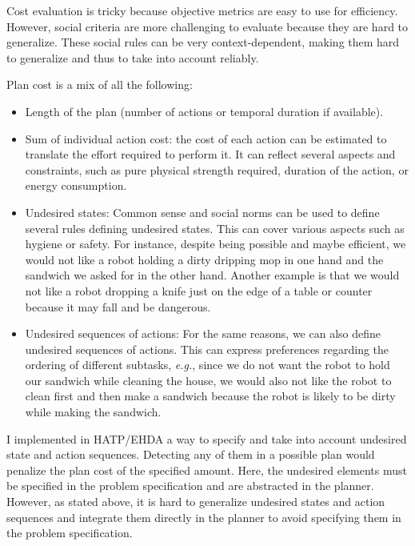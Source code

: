 Cost evaluation is tricky because objective metrics are easy to use for efficiency. However, social criteria are more challenging to evaluate because they are hard to generalize. These social rules can be very context-dependent, making them hard to generalize and thus to take into account reliably.

Plan cost is a mix of all the following:

\begin{itemize}
    \item Length of the plan (number of actions or temporal duration if available).
    \item Sum of individual action cost: the cost of each action can be estimated to translate the effort required to perform it. It can reflect several aspects and constraints, such as pure physical strength required, duration of the action, or energy consumption.
    \item Undesired states: Common sense and social norms can be used to define several rules defining undesired states. This can cover various aspects such as hygiene or safety. For instance, despite being possible and maybe efficient, we would not like a robot holding a dirty dripping mop in one hand and the sandwich we asked for in the other hand. Another example is that we would not like a robot dropping a knife just on the edge of a table or counter because it may fall and be dangerous. 
    \item Undesired sequences of actions: For the same reasons, we can also define undesired sequences of actions. This can express preferences regarding the ordering of different subtasks, \textit{e.g.}, since we do not want the robot to hold our sandwich while cleaning the house, we would also not like the robot to clean first and then make a sandwich because the robot is likely to be dirty while making the sandwich.  
\end{itemize}

I implemented in HATP/EHDA a way to specify and take into account undesired state and action sequences. Detecting any of them in a possible plan would penalize the plan cost of the specified amount. Here, the undesired elements must be specified in the problem specification and are abstracted in the planner. However, as stated above, it is hard to generalize undesired states and action sequences and integrate them directly in the planner to avoid specifying them in the problem specification.

